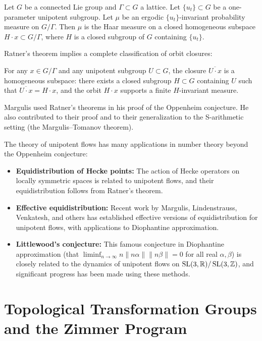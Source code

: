 \begin{theorem}
Let \(G\) be a connected Lie group and \(\Gamma \subset G\) a lattice. Let \(\{u_t\} \subset G\) be a one-parameter unipotent subgroup. Let \(\mu\) be an ergodic \(\{u_t\}\)-invariant probability measure on \(G/\Gamma\). Then \(\mu\) is the Haar measure on a closed homogeneous subspace \(H \cdot x \subset G/\Gamma\), where \(H\) is a closed subgroup of \(G\) containing \(\{u_t\}\).
\end{theorem}

Ratner's theorem implies a complete classification of orbit closures:

\begin{theorem}
For any \(x \in G/\Gamma\) and any unipotent subgroup \(U \subset G\), the closure \(\overline{U \cdot x}\) is a homogeneous subspace: there exists a closed subgroup \(H \subset G\) containing \(U\) such that \(\overline{U \cdot x} = H \cdot x\), and the orbit \(H \cdot x\) supports a finite \(H\)-invariant measure.
\end{theorem}

Margulis used Ratner's theorems in his proof of the Oppenheim conjecture. He also contributed to their proof and to their generalization to the S-arithmetic setting (the Margulis--Tomanov theorem).

The theory of unipotent flows has many applications in number theory beyond the Oppenheim conjecture:
\begin{itemize}
    \item \textbf{Equidistribution of Hecke points:} The action of Hecke operators on locally symmetric spaces is related to unipotent flows, and their equidistribution follows from Ratner's theorem.
    \item \textbf{Effective equidistribution:} Recent work by Margulis, Lindenstrauss, Venkatesh, and others has established effective versions of equidistribution for unipotent flows, with applications to Diophantine approximation.
    \item \textbf{Littlewood's conjecture:} This famous conjecture in Diophantine approximation (that \(\liminf_{n \to \infty} n \|n\alpha\| \|n\beta\| = 0\) for all real \(\alpha,\beta\)) is closely related to the dynamics of unipotent flows on \(\operatorname{SL}(3,\mathbb{R})/\operatorname{SL}(3,\mathbb{Z})\), and significant progress has been made using these methods.
\end{itemize}

\section{Topological Transformation Groups and the Zimmer Program}

